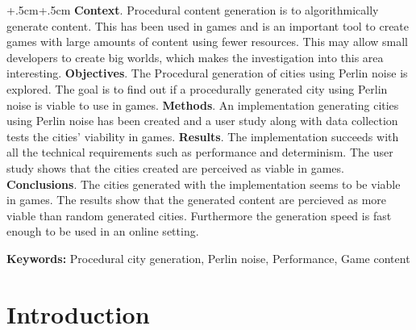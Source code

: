 \documentclass[a4paper,oneside]{bth}
\begin{document}
\abstract
\begin{changemargin}{+.5cm}{+.5cm}
\noindent
\textbf{Context}. Procedural content generation is to algorithmically generate content. This has been used in games and is an important tool to create games with large amounts of content using fewer resources. This may allow small developers to create big worlds, which makes the investigation into this area interesting.\newline
\textbf{Objectives}. The Procedural generation of cities using Perlin noise is explored. The goal is to find out if a procedurally generated city using Perlin noise is viable to use in games. \newline
\textbf{Methods}. An implementation generating cities using Perlin noise has been created and a user study along with data collection tests the cities' viability in games.\newline
\textbf{Results}. The implementation succeeds with all the technical requirements such as performance and determinism. The user study shows that the cities created are perceived as viable in games. \newline
\textbf{Conclusions}. The cities generated with the implementation seems to be viable in games. The results show that the generated content are percieved as more viable than random generated cities. Furthermore the generation speed is fast enough to be used in an online setting.

\vspace {1cm}
\noindent
\textbf{Keywords:} Procedural city generation, Perlin noise, Performance, Game content

\end{changemargin}


\tableofcontents

\cleardoublepage
\pagestyle{headings}


\chapter{Introduction}

\end{document}
